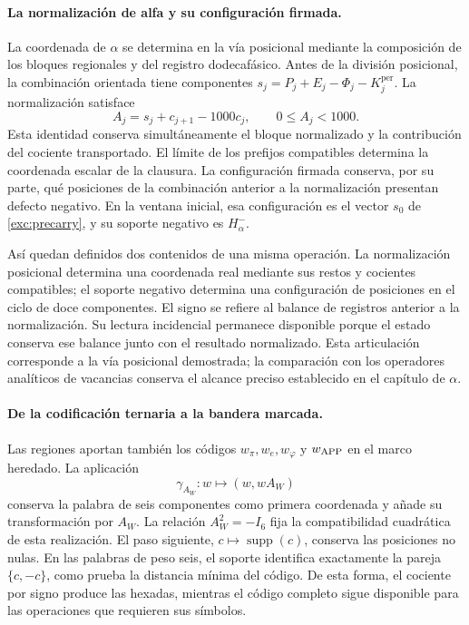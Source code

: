 \paragraph{La normalización de alfa y su configuración firmada.}
\label{inc-ampl-clausura}
La coordenada de $\alpha$ se determina en la vía posicional mediante la
composición de los bloques regionales y del registro dodecafásico. Antes
de la división posicional, la combinación orientada tiene componentes
$s_j=P_j+E_j-\Phi_j-K_j^{\mathrm{per}}$. La normalización satisface
\begin{equation}
 A_j=s_j+c_{j+1}-1000c_j,\qquad 0\leq A_j<1000.
 \label{inc-ampl-normalizacion}
\end{equation}
Esta identidad conserva simultáneamente el bloque normalizado y la
contribución del cociente transportado. El límite de los prefijos
compatibles determina la coordenada escalar de la clausura. La
configuración firmada conserva, por su parte, qué posiciones de la
combinación anterior a la normalización presentan defecto negativo.
En la ventana inicial, esa configuración es el vector $s_0$ de
\eqref{exc:precarry}, y su soporte negativo es $H^-_\alpha$.

Así quedan definidos dos contenidos de una misma operación. La
normalización posicional determina una coordenada real mediante sus
restos y cocientes compatibles; el soporte negativo determina una
configuración de posiciones en el ciclo de doce componentes. El signo se
refiere al balance de registros anterior a la normalización. Su lectura
incidencial permanece disponible porque el estado conserva ese balance
junto con el resultado normalizado. Esta articulación corresponde a la
vía posicional demostrada; la comparación con los operadores analíticos
de vacancias conserva el alcance preciso establecido en el capítulo de
$\alpha$.

\paragraph{De la codificación ternaria a la bandera marcada.}
\label{inc-ampl-bandera}
Las regiones aportan también los códigos $w_\pi,w_e,w_\varphi$ y
$w_{\rm APP}$ en el marco heredado. La aplicación
\[
 \gamma_{A_W}:w\longmapsto(w,wA_W)
\]
conserva la palabra de seis componentes como primera coordenada y añade
su transformación por $A_W$. La relación $A_W^2=-I_6$ fija la
compatibilidad cuadrática de esta realización. El paso siguiente,
$c\mapsto\operatorname{supp}(c)$, conserva las posiciones no nulas.
En las palabras de peso seis, el soporte identifica exactamente la pareja
$\{c,-c\}$, como prueba la distancia mínima del código. De esta forma,
el cociente por signo produce las hexadas, mientras el código completo
sigue disponible para las operaciones que requieren sus símbolos.

